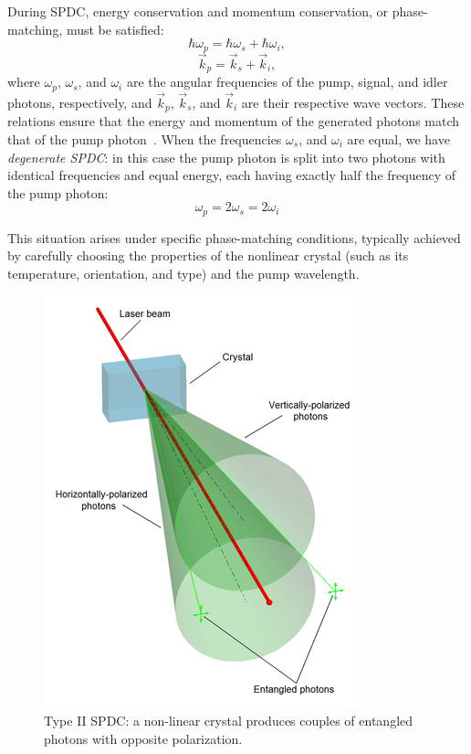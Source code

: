 \documentclass[prl,twocolumn]{revtex4-1}
\begin{document}
During SPDC, energy conservation and momentum conservation, or phase-matching, must be satisfied:
%
\begin{equation}
    \hbar \omega_p = \hbar \omega_s + \hbar \omega_i,
\end{equation}
\begin{equation}
    \vec{k}_p = \vec{k}_s + \vec{k}_i,
\end{equation}
%
where $\omega_p$, $\omega_s$, and $\omega_i$ are the angular frequencies of the pump, signal, and idler photons, respectively, and $\vec{k}_p$, $\vec{k}_s$, and $\vec{k}_i$ are their respective wave vectors. These relations ensure that the energy and momentum of the generated photons match that of the pump photon~\cite{pap3}. When the frequencies $\omega_s$, and $\omega_i$ are equal, we have \textit{degenerate SPDC}: in this case the pump photon is split into two photons with identical frequencies and equal energy, each having exactly half the frequency of the pump photon:
\begin{equation}
    \omega_p = 2 \omega_s = 2 \omega_i    
\end{equation}

This situation arises under specific phase-matching conditions, typically achieved by carefully choosing the properties of the nonlinear crystal (such as its temperature, orientation, and type) and the pump wavelength.

\begin{figure}[!b]
    \centering
    \includegraphics[width=0.7\linewidth]{Images/SPDC_cones.png}
    \caption{Type II SPDC: a non-linear crystal produces couples of entangled photons with opposite polarization.}
    \label{fig:SPDC_cones}
\end{figure}
\end{document}
